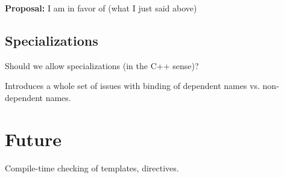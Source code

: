 \textbf{Proposal:} I am in favor of (what I just said above)

\subsection{Specializations}
\label{sec:templates:issues:specialization}

Should we allow specializations (in the C++ sense)?

Introduces a whole set of issues with binding of dependent names
vs. non-dependent names.  

\section{Future}
\label{sec:templates:future}

Compile-time checking of templates, directives.  

